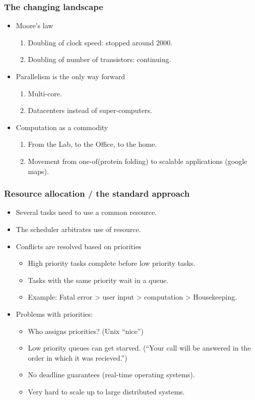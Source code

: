 \documentclass{beamer}
\begin{document}
\begin{frame}
\frametitle{The changing landscape}
\begin{itemize}
\item Moore's law
\begin{enumerate}
\item Doubling of clock speed: stopped around 2000.
\item Doubling of number of transistors: continuing.
\end{enumerate}
\item Parallelism is the only way forward
\begin{enumerate}
\item Multi-core.
\item Datacenters instead of super-computers.
\end{enumerate}
\item Computation as a commodity
\begin{enumerate}
\item From the Lab, to the Office, to the home.
\item Movement from one-of(protein folding) to scalable applications
  (google maps).
\end{enumerate}
\end{itemize}
\end{frame}

\begin{frame}
\frametitle{Resource allocation / the standard approach}
\begin{itemize}
\item Several tasks need to use a common resource.
\item The {\color{blue} scheduler} arbitrates use of resource.
\item Conflicts are resolved based on {\color{blue} priorities}
\begin{itemize}
\item High priority tasks complete before low priority tasks.
\item Tasks with the same priority wait in a queue.
\item Example: Fatal error > user input > computation > Housekeeping. 
\end{itemize}
\item Problems with priorities:
\begin{itemize}
\item Who assigns priorities? (Unix ``nice'')
\item Low priority queues can get starved. (``Your call will be
  answered in the order in which it was recieved.'')
\item No deadline guarantees (real-time operating systems).
\item Very hard to scale up to large distributed systems.
\end{itemize}
\end{itemize}
\end{frame}
\end{document}
